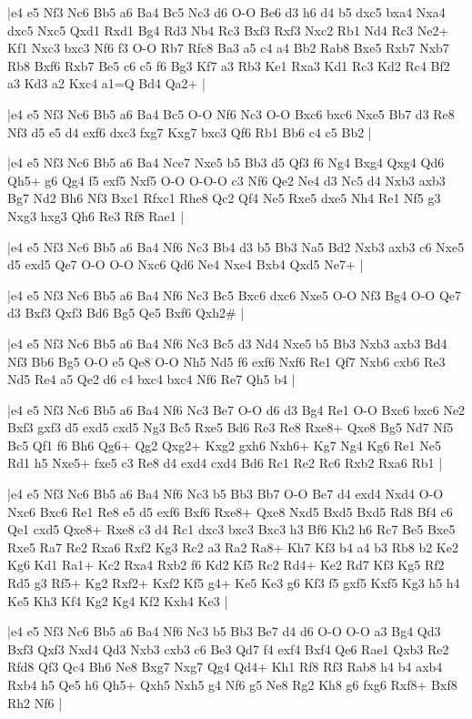 \whitename{}
\blackname{}
\makegametitle
|e4 e5 Nf3 Nc6 Bb5 a6 Ba4 Bc5 Nc3 d6 O-O Be6 d3 h6 d4 b5 dxc5 bxa4 Nxa4 dxc5 Nxc5 Qxd1 Rxd1 Bg4 Rd3 Nb4 Rc3 Bxf3 Rxf3 Nxc2 Rb1 Nd4 Rc3 Ne2+ Kf1 Nxc3 bxc3 Nf6 f3 O-O Rb7 Rfc8 Ba3 a5 c4 a4 Bb2 Rab8 Bxe5 Rxb7 Nxb7 Rb8 Bxf6 Rxb7 Be5 c6 c5 f6 Bg3 Kf7 a3 Rb3 Ke1 Rxa3 Kd1 Rc3 Kd2 Rc4 Bf2 a3 Kd3 a2 Kxc4 a1=Q Bd4 Qa2+  |

\whitename{}
\blackname{}
\makegametitle
|e4 e5 Nf3 Nc6 Bb5 a6 Ba4 Bc5 O-O Nf6 Nc3 O-O Bxc6 bxc6 Nxe5 Bb7 d3 Re8 Nf3 d5 e5 d4 exf6 dxc3 fxg7 Kxg7 bxc3 Qf6 Rb1 Bb6 c4 c5 Bb2  |

\whitename{}
\blackname{}
\makegametitle
|e4 e5 Nf3 Nc6 Bb5 a6 Ba4 Nce7 Nxe5 b5 Bb3 d5 Qf3 f6 Ng4 Bxg4 Qxg4 Qd6 Qh5+ g6 Qg4 f5 exf5 Nxf5 O-O O-O-O c3 Nf6 Qe2 Ne4 d3 Nc5 d4 Nxb3 axb3 Bg7 Nd2 Bh6 Nf3 Bxc1 Rfxc1 Rhe8 Qc2 Qf4 Ne5 Rxe5 dxe5 Nh4 Re1 Nf5 g3 Nxg3 hxg3 Qh6 Re3 Rf8 Rae1  |

\whitename{}
\blackname{}
\makegametitle
|e4 e5 Nf3 Nc6 Bb5 a6 Ba4 Nf6 Nc3 Bb4 d3 b5 Bb3 Na5 Bd2 Nxb3 axb3 c6 Nxe5 d5 exd5 Qe7 O-O O-O Nxc6 Qd6 Ne4 Nxe4 Bxb4 Qxd5 Ne7+  |

\whitename{}
\blackname{}
\makegametitle
|e4 e5 Nf3 Nc6 Bb5 a6 Ba4 Nf6 Nc3 Bc5 Bxc6 dxc6 Nxe5 O-O Nf3 Bg4 O-O Qe7 d3 Bxf3 Qxf3 Bd6 Bg5 Qe5 Bxf6 Qxh2\#  |

\whitename{}
\blackname{}
\makegametitle
|e4 e5 Nf3 Nc6 Bb5 a6 Ba4 Nf6 Nc3 Bc5 d3 Nd4 Nxe5 b5 Bb3 Nxb3 axb3 Bd4 Nf3 Bb6 Bg5 O-O e5 Qe8 O-O Nh5 Nd5 f6 exf6 Nxf6 Re1 Qf7 Nxb6 cxb6 Re3 Nd5 Re4 a5 Qe2 d6 c4 bxc4 bxc4 Nf6 Re7 Qh5 b4  |

\whitename{}
\blackname{}
\makegametitle
|e4 e5 Nf3 Nc6 Bb5 a6 Ba4 Nf6 Nc3 Be7 O-O d6 d3 Bg4 Re1 O-O Bxc6 bxc6 Ne2 Bxf3 gxf3 d5 exd5 cxd5 Ng3 Bc5 Rxe5 Bd6 Re3 Re8 Rxe8+ Qxe8 Bg5 Nd7 Nf5 Bc5 Qf1 f6 Bh6 Qg6+ Qg2 Qxg2+ Kxg2 gxh6 Nxh6+ Kg7 Ng4 Kg6 Re1 Ne5 Rd1 h5 Nxe5+ fxe5 c3 Re8 d4 exd4 cxd4 Bd6 Rc1 Re2 Rc6 Rxb2 Rxa6 Rb1  |

\whitename{}
\blackname{}
\makegametitle
|e4 e5 Nf3 Nc6 Bb5 a6 Ba4 Nf6 Nc3 b5 Bb3 Bb7 O-O Be7 d4 exd4 Nxd4 O-O Nxc6 Bxc6 Re1 Re8 e5 d5 exf6 Bxf6 Rxe8+ Qxe8 Nxd5 Bxd5 Bxd5 Rd8 Bf4 c6 Qe1 cxd5 Qxe8+ Rxe8 c3 d4 Rc1 dxc3 bxc3 Bxc3 h3 Bf6 Kh2 h6 Rc7 Be5 Bxe5 Rxe5 Ra7 Re2 Rxa6 Rxf2 Kg3 Rc2 a3 Ra2 Ra8+ Kh7 Kf3 b4 a4 b3 Rb8 b2 Ke2 Kg6 Kd1 Ra1+ Kc2 Rxa4 Rxb2 f6 Kd2 Kf5 Rc2 Rd4+ Ke2 Rd7 Kf3 Kg5 Rf2 Rd5 g3 Rf5+ Kg2 Rxf2+ Kxf2 Kf5 g4+ Ke5 Ke3 g6 Kf3 f5 gxf5 Kxf5 Kg3 h5 h4 Ke5 Kh3 Kf4 Kg2 Kg4 Kf2 Kxh4 Ke3  |

\whitename{}
\blackname{}
\makegametitle
|e4 e5 Nf3 Nc6 Bb5 a6 Ba4 Nf6 Nc3 b5 Bb3 Be7 d4 d6 O-O O-O a3 Bg4 Qd3 Bxf3 Qxf3 Nxd4 Qd3 Nxb3 cxb3 c6 Be3 Qd7 f4 exf4 Bxf4 Qe6 Rae1 Qxb3 Re2 Rfd8 Qf3 Qc4 Bh6 Ne8 Bxg7 Nxg7 Qg4 Qd4+ Kh1 Rf8 Rf3 Rab8 h4 b4 axb4 Rxb4 h5 Qe5 h6 Qh5+ Qxh5 Nxh5 g4 Nf6 g5 Ne8 Rg2 Kh8 g6 fxg6 Rxf8+ Bxf8 Rh2 Nf6  |

